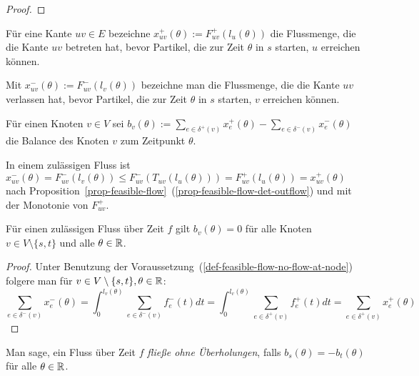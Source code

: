 \begin{proof}
\end{proof}



\begin{definition}
	Für eine Kante $uv\in E$ bezeichne $x_{uv}^+(\theta):= F_{uv}^+(l_u(\theta))$ die Flussmenge, die die Kante $uv$ betreten hat, bevor Partikel, die zur Zeit $\theta$ in $s$ starten, $u$ erreichen können.
	
	Mit $x_{uv}^-(\theta):= F^-_{uv}(l_v(\theta))$ bezeichne man die Flussmenge, die die Kante $uv$ verlassen hat, bevor Partikel, die zur Zeit $\theta$ in $s$ starten, $v$ erreichen können.
	
	Für einen Knoten $v\in V$ sei $b_v(\theta):=\sum_{e\in\delta^+(v)} x_e^+(\theta) - \sum_{e\in\delta^-(v)} x_e^-(\theta)$ die Balance des Knoten $v$ zum Zeitpunkt $\theta$.
\end{definition}


\begin{remark}\label{remark-x^-leqx^+}
	In einem zulässigen Fluss ist $x_{uv}^-(\theta) = F_{uv}^-(l_v(\theta)) \leq F_{uv}^-(T_{uv}(l_u(\theta)))=F_{uv}^+(l_u(\theta)) = x_{uv}^+(\theta)$
	 nach Proposition~\ref{prop-feasible-flow}~(\ref{prop-feasible-flow-det-outflow}) und mit der Monotonie von $F_{uv}^+$.
\end{remark}

\begin{lemma}\label{lemma-balance-0}
	Für einen zulässigen Fluss über Zeit $f$ gilt $b_v(\theta)=0$ für alle Knoten $v\in V\setminus\{ s,t \}$ und alle $\theta\in\mathbb{R}$.
\end{lemma}
\begin{proof}
	Unter Benutzung der Voraussetzung~(\ref{def-feasible-flow-no-flow-at-node}) folgere man für $v\in V\setminus \{ s, t\}, \theta\in\mathbb{R}$:
	$$\sum_{e\in\delta^-(v)} x_e^-(\theta) = \int_{0}^{l_v(\theta)} \sum_{e\in\delta^-(v)} f_e^-(t) dt = \int_{0}^{l_v(\theta)} \sum_{e\in\delta^+(v)} f_e^+(t) dt = \sum_{e\in\delta^+(v)}x_e^+(\theta)$$
\end{proof}

\begin{definition}
	Man sage, ein Fluss über Zeit $f$ \emph{fließe ohne Überholungen}, falls $b_s(\theta) = -b_t(\theta)$ für alle $\theta\in\mathbb{R}$.
\end{definition}


